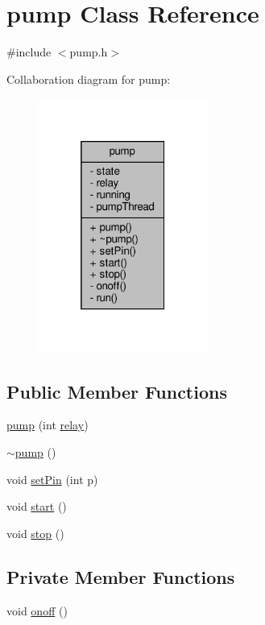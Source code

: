 \hypertarget{classpump}{}\section{pump Class Reference}
\label{classpump}


{\ttfamily \#include $<$pump.\+h$>$}



Collaboration diagram for pump\+:
\nopagebreak
\begin{figure}[H]
\begin{center}
\leavevmode
\includegraphics[width=157pt]{classpump__coll__graph}
\end{center}
\end{figure}
\subsection*{Public Member Functions}
\begin{DoxyCompactItemize}
\item 
\hyperlink{classpump_a57d3d6b37505970fc9524064fdc46b96}{pump} (int \hyperlink{classpump_a31d0a2af60c2193f5e5a6e4e51c56ec6}{relay})
\item 
\hyperlink{classpump_a17a634b5d8443578744bbd4c9eff9d87}{$\sim$pump} ()
\item 
void \hyperlink{classpump_a3c9536b9c3d2fdb7908b6cba845990d1}{set\+Pin} (int p)
\item 
void \hyperlink{classpump_a324936e9353f28b7633e838a9f1fff20}{start} ()
\item 
void \hyperlink{classpump_add87c3bee2a6faba0404e9ce115d0d17}{stop} ()
\end{DoxyCompactItemize}
\subsection*{Private Member Functions}
\begin{DoxyCompactItemize}
\item 
void \hyperlink{classpump_af6264b2a6b6e66ed1027565a44561647}{onoff} ()
\end{DoxyCompactItemize}
